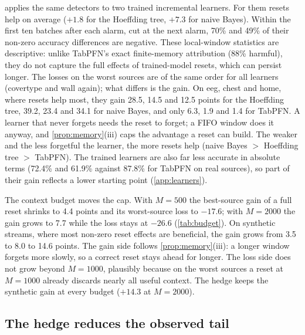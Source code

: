 \documentclass[10pt]{article}
\theoremstyle{definition}
\theoremstyle{remark}
\begin{document}


 applies the same detectors to two trained incremental learners. For them resets help on average
($+1.8$ for the Hoeffding tree, $+7.3$ for naive Bayes). Within the first ten batches after each alarm, cut at the
next alarm, 70\% and 49\% of their non-zero accuracy differences are negative. These local-window statistics are
descriptive: unlike TabPFN's exact finite-memory attribution (88\% harmful), they do not capture the full effects
of trained-model resets, which can persist longer. The losses on the worst sources are of the same order for all learners (covertype and wall again); what
differs is the gain. On eeg, chest and home, where resets help most, they gain 28.5, 14.5 and 12.5 points for the
Hoeffding tree, 39.2, 23.4 and 34.1 for naive Bayes, and only 6.3, 1.9 and 1.4 for TabPFN. A learner that never forgets needs the reset to forget; a FIFO window
does it anyway, and \cref{prop:memory}(iii) caps the advantage a reset can build. The weaker and the less forgetful the
learner, the more resets help (naive Bayes $>$ Hoeffding tree $>$ TabPFN). The trained learners are also far less accurate in
absolute terms (72.4\% and 61.9\% against 87.8\% for TabPFN on real sources), so part of their gain reflects a lower
starting point (\cref{app:learners}).



The context budget moves the cap. With $M=500$ the best-source gain of a full reset shrinks to 4.4 points and its
worst-source loss to $-17.6$; with $M=2000$ the gain grows to 7.7 while the loss stays at $-26.6$ (\cref{tab:budget}).
On synthetic streams, where most non-zero reset effects are beneficial, the gain grows from 3.5 to 8.0 to 14.6 points. The gain side
follows \cref{prop:memory}(iii): a longer window forgets more slowly, so a correct reset stays ahead for longer. The
loss side does not grow beyond $M=1000$, plausibly because on the worst sources a reset at $M=1000$ already discards
nearly all useful context. The hedge keeps the synthetic gain at every budget ($+14.3$ at $M=2000$).

\subsection{The hedge reduces the observed tail}
\end{document}
